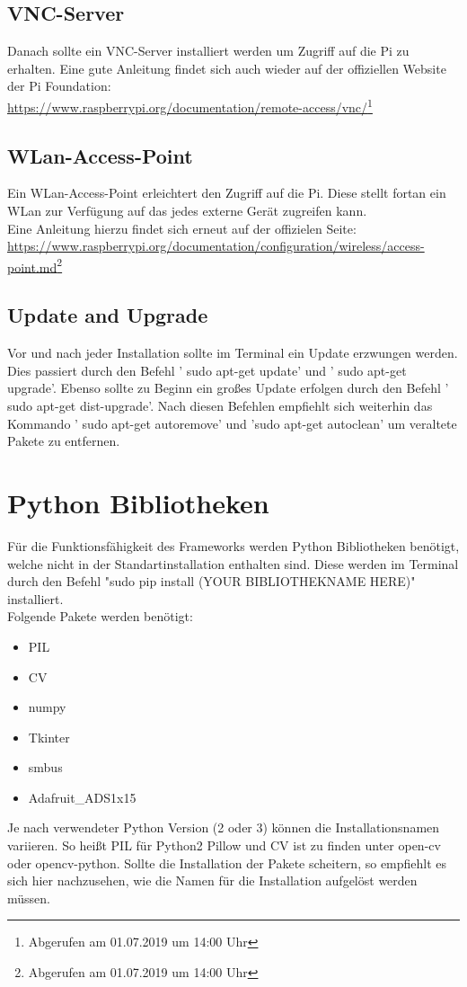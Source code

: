 \documentclass[a4paper,cleardoubleempty,BCOR1cm]{book}
\begin{document}
\subsection{VNC-Server}
Danach sollte ein VNC-Server installiert werden um Zugriff auf die Pi zu erhalten. Eine gute Anleitung findet sich auch wieder auf der offiziellen Website der Pi Foundation:\\
\url{https://www.raspberrypi.org/documentation/remote-access/vnc/}\footnote{Abgerufen am 01.07.2019 um 14:00 Uhr}


\subsection{WLan-Access-Point}
Ein WLan-Access-Point erleichtert den Zugriff auf die Pi. Diese stellt fortan ein WLan zur Verfügung auf das jedes externe Gerät zugreifen kann. \\
Eine Anleitung hierzu findet sich erneut auf der offizielen Seite:\\
\url{https://www.raspberrypi.org/documentation/configuration/wireless/access-point.md}\footnote{Abgerufen am 01.07.2019 um 14:00 Uhr}

\subsection{Update and Upgrade}
Vor und nach jeder Installation sollte im Terminal ein Update erzwungen werden. Dies passiert durch den Befehl ' sudo apt-get update' und ' sudo apt-get upgrade'. Ebenso sollte zu Beginn ein großes Update erfolgen durch den Befehl ' sudo apt-get dist-upgrade'. Nach diesen Befehlen empfiehlt sich weiterhin das Kommando ' sudo apt-get autoremove' und 'sudo apt-get autoclean' um veraltete Pakete zu entfernen. 

\section{Python Bibliotheken}

Für die Funktionsfähigkeit des Frameworks werden Python Bibliotheken benötigt, welche nicht in der Standartinstallation enthalten sind. Diese werden im Terminal durch den Befehl "sudo pip install (YOUR BIBLIOTHEKNAME HERE)" installiert.\\
Folgende Pakete werden benötigt: 
\begin{center}
	\begin{itemize}
		\item PIL
		\item CV
		\item numpy
		\item Tkinter
		\item smbus
		\item Adafruit\_ADS1x15
	\end{itemize}
\end{center}
Je nach verwendeter Python Version (2 oder 3) können die Installationsnamen variieren. So heißt PIL für Python2 Pillow und CV ist zu finden unter open-cv oder opencv-python. Sollte die Installation der Pakete scheitern, so empfiehlt es sich hier nachzusehen, wie die Namen für die Installation aufgelöst werden müssen. 
\end{document}
